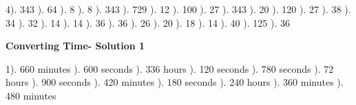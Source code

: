 \documentclass{article}%
\begin{document}
4). 343%
). 64%
). 8%
). 8%
). 343%
). 729%
). 12%
). 100%
). 27%
). 343%
). 20%
). 120%
). 27%
). 38%
). 34%
). 32%
). 14%
). 14%
). 36%
). 36%
). 26%
). 20%
). 18%
). 14%
). 40%
). 125%
). 36%
\newline%
\newpage%
\large%
\begin{center}%
\textbf{Converting Time- Solution 1}%
\newline%
\end{center} \normalsize%
1). 660 minutes%
). 600 seconds%
). 336 hours%
). 120 seconds%
). 780 seconds%
). 72 hours%
). 900 seconds%
). 420 minutes%
). 180 seconds%
). 240 hours%
). 360 minutes%
). 480 minutes%
\newline%
\end{document}
